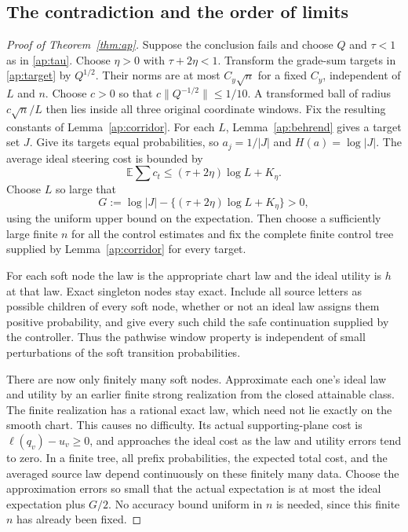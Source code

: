 \documentclass[11pt]{article}
\numberwithin{equation}{section}
\theoremstyle{definition}
\theoremstyle{remark}
\newcommand{\E}{\mathbb E}
\begin{document}
\subsection{The contradiction and the order of limits}

\begin{proof}[Proof of Theorem~\ref{thm:ap}]
Suppose the conclusion fails and choose \(Q\) and \(\tau<1\) as in
\eqref{ap:tau}.  Choose \(\eta>0\) with \(\tau+2\eta<1\).
Transform the grade-sum targets in \eqref{ap:target} by \(Q^{1/2}\).
Their norms are at most \(C_y\sqrt n\) for a fixed \(C_y\), independent
of \(L\) and \(n\).  Choose \(c>0\) so that
\(c\|Q^{-1/2}\|\leq1/10\).  A transformed ball of radius
\(c\sqrt n/L\) then lies inside all three original coordinate windows.
Fix the resulting constants of Lemma~\ref{ap:corridor}.
For each \(L\), Lemma~\ref{ap:behrend}
gives a target set \(J\).  Give its targets equal probabilities, so
\(a_j=1/|J|\) and \(H(a)=\log|J|\).  The average ideal steering
cost is bounded by
\[
 \E\sum c_t\leq(\tau+2\eta)\log L+K_\eta.
\]
Choose \(L\) so large that
\begin{equation}\label{ap:strict-gain}
 G:=\log|J|-\{(\tau+2\eta)\log L+K_\eta\}>0,
\end{equation}
using the uniform upper bound on the expectation.  Then choose a
sufficiently large finite \(n\) for all the control estimates and fix
the complete finite control tree supplied by Lemma~\ref{ap:corridor}
for every target.

For each soft node the law is the appropriate chart law and the ideal
utility is \(h\) at that law.  Exact singleton nodes stay exact.
Include all source letters as possible children of every soft node,
whether or not an ideal law assigns them positive probability, and give
every such child the safe continuation supplied by the controller.
Thus the pathwise window property is independent of small perturbations
of the soft transition probabilities.

There are now only finitely many soft nodes.  Approximate each one's
ideal law and utility by an earlier finite strong realization from the
closed attainable class.  The finite realization has a rational exact
law, which need not lie exactly on the smooth chart.  This causes no
difficulty.  Its actual supporting-plane cost is
\(\ell(q_v)-u_v\geq0\), and approaches the ideal cost as the law and
utility errors tend to zero.  In a finite tree, all prefix probabilities,
the expected total cost, and the averaged source law depend continuously
on these finitely many data.  Choose the approximation errors so small
that the actual expectation is at most the ideal expectation plus
\(G/2\).  No accuracy bound uniform in \(n\) is needed, since this
finite \(n\) has already been fixed.


\end{proof}
\end{document}
